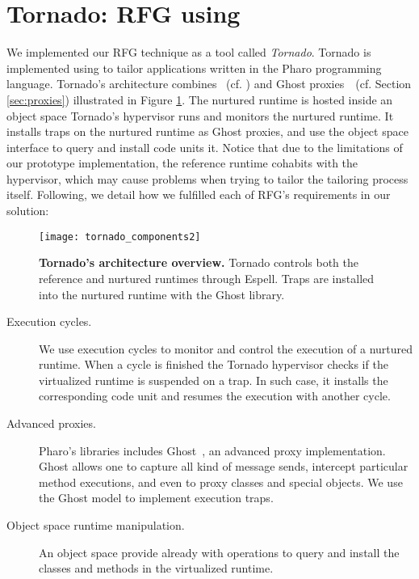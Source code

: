 \section{Tornado: RFG using \Vtt} \label{sec:rfg_implementation}

We implemented our RFG technique as a tool called \emph{Tornado}. Tornado is implemented using \Vtt to tailor applications written in the Pharo programming language.
Tornado's architecture combines \Vtt~(cf. ) and Ghost proxies~\cite{Mart14z}~(cf. Section \ref{sec:proxies}) illustrated in Figure \ref{fig:tornado_code units}. The nurtured runtime is hosted inside an object space Tornado's hypervisor runs and monitors the nurtured runtime. It installs traps on the nurtured runtime as Ghost proxies, and use the object space interface to query and install code units it. Notice that due to the limitations of our prototype implementation, the reference runtime cohabits with the hypervisor, which may cause problems when trying to tailor the tailoring process itself. Following, we detail how we fulfilled each of RFG's requirements in our solution:

\begin{figure}[ht]
\begin{center}
\texttt{[image: tornado\_components2]}
\caption{\small\textbf{Tornado's architecture overview.} Tornado controls both the reference and nurtured runtimes through Espell. Traps are installed into the nurtured runtime with the Ghost library.\label{fig:tornado_code units}}
\end{center}
\end{figure}

\begin{description}
\item[Execution cycles.] We use \Vtt execution cycles to monitor and control the execution of a nurtured runtime. When a cycle is finished the Tornado hypervisor checks if the virtualized runtime is suspended on a trap. In such case, it installs the corresponding code unit and resumes the execution with another cycle.

\item[Advanced proxies.] Pharo's libraries includes Ghost~\cite{Mart11a}, an advanced proxy implementation. Ghost allows one to capture all kind of message sends, intercept particular method executions, and even to proxy classes and special objects. We use the Ghost model to implement execution traps.

\item[Object space runtime manipulation.] An object space provide already with operations to query and install the classes and methods in the virtualized runtime.

\end{description}

